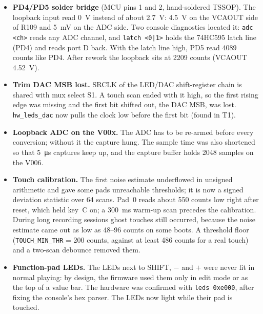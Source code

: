 \documentclass[11pt,a4paper]{article}
\begin{document}
\begin{itemize}
  \item \textbf{PD4/PD5 solder bridge} (MCU pins 1 and 2, hand-soldered TSSOP). The loopback input read
    \SI{0}{V} instead of about \SI{2.7}{V}: \SI{4.5}{V} on the VCAOUT side of R109 and \SI{5}{mV} on the ADC
    side. Two console diagnostics located it: \texttt{adc <ch>} reads any ADC channel, and \texttt{latch
    <0|1>} holds the 74HC595 latch line (PD4) and reads port D back. With the latch line high, PD5 read
    4089 counts like PD4. After rework the loopback sits at 2209 counts (VCAOUT \SI{4.52}{V}).
  \item \textbf{Trim DAC MSB lost.} SRCLK of the LED/DAC shift-register chain is shared with mux select S1. A
    touch scan ended with it high, so the first rising edge was missing and the first bit shifted out, the DAC
    MSB, was lost. \texttt{hw\_leds\_dac} now pulls the clock low before the first bit (found in T1).
  \item \textbf{Loopback ADC on the V00x.} The ADC has to be re-armed before every conversion; without it the
    capture hung. The sample time was also shortened so that \SI{5}{\micro s} captures keep up, and the capture
    buffer holds 2048 samples on the V006.
  \item \textbf{Touch calibration.} The first noise estimate underflowed in unsigned arithmetic and gave some
    pads unreachable thresholds; it is now a signed deviation statistic over 64 scans. Pad~0 reads about
    550 counts low right after reset, which held key~C on; a \SI{300}{ms} warm-up scan precedes the
    calibration. During long recording sessions ghost touches still occurred, because the noise estimate
    came out as low as 48--96 counts on some boots. A threshold floor (\texttt{TOUCH\_MIN\_THR} = 200
    counts, against at least 486 counts for a real touch) and a two-scan debounce removed them.
  \item \textbf{Function-pad LEDs.} The LEDs next to SHIFT, $-$ and $+$ were never lit in normal playing:
    by design, the firmware used them only in edit mode or as the top of a value bar. The hardware was
    confirmed with \texttt{leds 0xe000}, after fixing the console's hex parser. The LEDs now light while
    their pad is touched.
\end{itemize}
\end{document}
